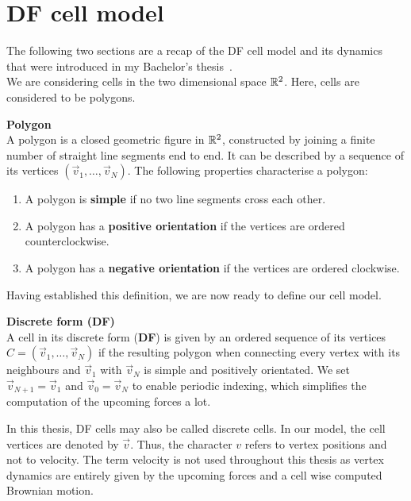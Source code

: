 \section{DF cell model} 

The following two sections are a recap of the DF cell model and its dynamics that were introduced in my Bachelor's thesis~\cite{Vogel2023}. \\
We are considering cells in the two dimensional space $\mathbb{R}^2$. Here, cells are considered to be polygons. 

\begin{definition} \textbf{Polygon} \\
	A polygon is a closed geometric figure in $\mathbb{R}^2$, constructed by joining a finite number of straight line segments end to end. 
	It can be described by a sequence of its vertices $(\vec{v}_1, \ldots, \vec{v}_N)$.
	The following properties characterise a polygon:
	\begin{enumerate}
		\item A polygon is \textbf{simple} if no two line segments cross each other. 
		\item A polygon has a \textbf{positive orientation} if the vertices are ordered counterclockwise.
		\item A polygon has a \textbf{negative orientation} if the vertices are ordered clockwise.
	\end{enumerate}
\end{definition}

Having established this definition, we are now ready to define our cell model.

\begin{definition} \textbf{Discrete form (DF)} \label{def:DF}  \\
	A cell in its discrete form (\textbf{DF}) is given by an ordered sequence of its vertices $C = (\vec{v}_1, \ldots , \vec{v}_N)$ if the resulting polygon when connecting every vertex with its neighbours and $\vec{v}_1$ with $\vec{v}_N$  is simple and positively orientated. 
	We set $\vec{v}_{N+1} = \vec{v}_{1}$ and $\vec{v}_{0} = \vec{v}_{N}$ to enable periodic indexing, which simplifies the computation of the upcoming forces a lot.
\end{definition}

In this thesis, DF cells may also be called discrete cells. 
In our model, the cell vertices are denoted by $\vec{v}$. 
Thus, the character $v$ refers to vertex positions and not to velocity.
The term velocity is not used throughout this thesis as vertex dynamics are entirely given by the upcoming forces and a cell wise computed Brownian motion. \\


